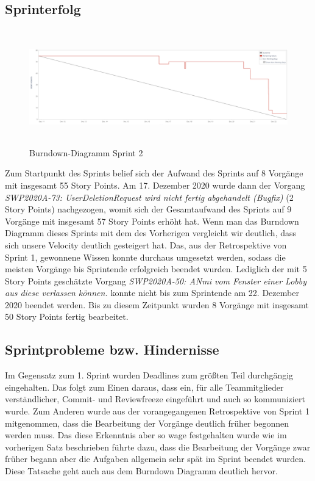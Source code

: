\documentclass[12pt,a4paper, oneside]{article}
\begin{document}
    \subsection{Sprinterfolg}
    \begin{figure}[h]
        \centering
        \includegraphics[width=\textwidth, height=5cm]{img/sprint_02/Burndown-Sprint2.PNG}
        \caption{Burndown-Diagramm Sprint 2}
        \label{fig: Burndown-Sprint2}
    \end{figure}

    \noindent
    Zum Startpunkt des Sprints belief sich der Aufwand des Sprints auf 8 Vorgänge mit insgesamt 55 Story Points. Am 17. Dezember 2020 wurde dann der Vorgang \textit{SWP2020A-73: UserDeletionRequest wird nicht fertig abgehandelt (Bugfix)} (2 Story Points) nachgezogen, womit sich der Gesamtaufwand des Sprints auf 9 Vorgänge mit insgesamt 57 Story Points erhöht hat. Wenn man das Burndown Diagramm dieses Sprints mit dem des Vorherigen vergleicht wir deutlich, dass sich unsere Velocity deutlich gesteigert hat. Das, aus der Retrospektive von Sprint 1, gewonnene Wissen konnte durchaus umgesetzt werden, sodass die meisten Vorgänge bis Sprintende erfolgreich beendet wurden. Lediglich der mit 5 Story Points geschätzte Vorgang \textit{SWP2020A-50: ANmi vom Fenster einer Lobby aus diese verlassen können.} konnte nicht bis zum Sprintende am 22. Dezember 2020 beendet werden. Bis zu diesem Zeitpunkt wurden 8 Vorgänge mit insgesamt 50 Story Points fertig bearbeitet.

    \subsection{Sprintprobleme bzw. Hindernisse}

    Im Gegensatz zum 1. Sprint wurden Deadlines zum größten Teil durchgängig eingehalten. Das folgt zum Einen daraus, dass ein, für alle Teammitglieder verständlicher, Commit- und Reviewfreeze eingeführt und auch so kommuniziert wurde. Zum Anderen wurde aus der vorangegangenen Retrospektive von Sprint 1 mitgenommen, dass die Bearbeitung der Vorgänge deutlich früher begonnen werden muss. Das diese Erkenntnis aber so wage festgehalten wurde wie im vorherigen Satz beschrieben führte dazu, dass die Bearbeitung der Vorgänge zwar früher begann aber die Aufgaben allgemein sehr spät im Sprint beendet wurden. Diese Tatsache geht auch aus dem Burndown Diagramm deutlich hervor.
\end{document}
